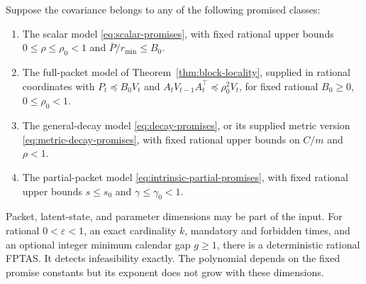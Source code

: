 \begin{theorem}
\label{thm:trace-fptas}
Suppose the covariance belongs to any of the following promised classes:
\begin{enumerate}
\item The scalar model \eqref{eq:scalar-promises}, with fixed rational upper
bounds $0\le\rho\le\rho_0<1$ and $\overline P/r_{\min}\le B_0$.
\item The full-packet model of Theorem~\ref{thm:block-locality}, supplied in
rational coordinates with
$P_t\preceq B_0V_t$ and
$A_tV_{t-1}A_t^\top\preceq\rho_0^2V_t$, for fixed rational
$B_0\ge0$, $0\le\rho_0<1$.
\item The general-decay model \eqref{eq:decay-promises}, or its supplied
metric version \eqref{eq:metric-decay-promises}, with fixed rational
upper bounds on $C/m$ and $\rho<1$.
\item The partial-packet model \eqref{eq:intrinsic-partial-promises}, with
fixed rational upper bounds $s\le s_0$ and $\gamma\le\gamma_0<1$.
\end{enumerate}
Packet, latent-state, and parameter dimensions may be part of the input.
For rational $0<\varepsilon<1$, an exact cardinality $k$, mandatory and forbidden times, and an optional
integer minimum calendar gap $g\ge1$, there is a deterministic rational
FPTAS. It detects infeasibility exactly. The polynomial depends on the fixed
promise constants but its exponent does not grow with these dimensions.
\end{theorem}
